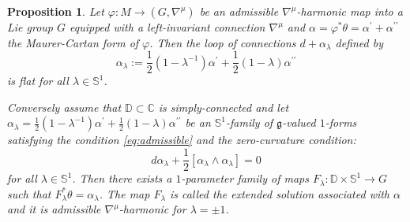 \documentclass[12pt]{amsart}
\newtheorem{Proposition}[Theorem]{Proposition}
\theoremstyle{definition}
\theoremstyle{remark}
\numberwithin{equation}{section}
\begin{document}
\begin{Proposition}\label{prop:admissibleharmonic}
 Let $\varphi:M\to (G, {\nabla^{\mu}})$ be an admissible ${\nabla^{\mu}}$-harmonic map into a 
 Lie group $G$ equipped with a left-invariant connection $\nabla^\mu$
 and $\alpha = \varphi^{*}\theta = \alpha^{\prime}+
 \alpha^{\prime \prime}$ the Maurer-Cartan form of $\varphi$.
 Then the loop of connections $d+\alpha_{\lambda}$ defined by
\begin{equation}\label{alpha-family}
 \alpha_{\lambda}:=
\frac{1}{2}(1-\lambda^{-1})\alpha^{\prime} 
 +\frac{1}{2}(1-\lambda)\alpha^{\prime\prime}
\end{equation}
 is flat for all $\lambda \in \mathbb S^1$. 

 Conversely assume that $\mathbb{D} \subset \mathbb C$ is simply-connected
 and let $\alpha_{\lambda}=
 \frac{1}{2}(1-\lambda^{-1})\alpha^{\prime}+
 \frac{1}{2}(1-\lambda)\alpha^{\prime \prime}$ 
 be an $\mathbb{S}^1$-family of 
 $\mathfrak{g}$-valued $1$-forms satisfying 
 the condition \eqref{eq:admissible} and 
 the zero-curvature condition{\rm:}
\begin{equation*}
 d\alpha_{\lambda}+\frac{1}{2}[\alpha_\lambda\wedge \alpha_\lambda]=0
\end{equation*}
 for all $\lambda \in \mathbb{S}^1$.
 Then there exists a $1$-parameter family of maps $F_\lambda:
 \mathbb{D}\times \mathbb{S}^1\to G$ such that 
 $F_{\lambda}^{*}\theta= \alpha_{\lambda}$. 
 The map $F_{\lambda}$ is called 
 the \textrm{extended solution associated with $\alpha$ and it is}
 \textrm{admissible} ${\nabla^{\mu}}$-harmonic for $\lambda=\pm 1$. 
\end{Proposition}
\end{document}
